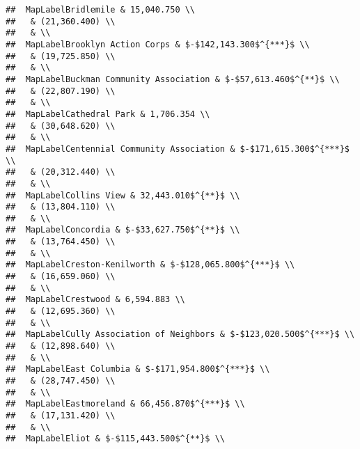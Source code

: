 \documentclass[]{article}
\begin{document}
\begin{verbatim}
##  MapLabelBridlemile & 15,040.750 \\ 
##   & (21,360.400) \\ 
##   & \\ 
##  MapLabelBrooklyn Action Corps & $-$142,143.300$^{***}$ \\ 
##   & (19,725.850) \\ 
##   & \\ 
##  MapLabelBuckman Community Association & $-$57,613.460$^{**}$ \\ 
##   & (22,807.190) \\ 
##   & \\ 
##  MapLabelCathedral Park & 1,706.354 \\ 
##   & (30,648.620) \\ 
##   & \\ 
##  MapLabelCentennial Community Association & $-$171,615.300$^{***}$ \\ 
##   & (20,312.440) \\ 
##   & \\ 
##  MapLabelCollins View & 32,443.010$^{**}$ \\ 
##   & (13,804.110) \\ 
##   & \\ 
##  MapLabelConcordia & $-$33,627.750$^{**}$ \\ 
##   & (13,764.450) \\ 
##   & \\ 
##  MapLabelCreston-Kenilworth & $-$128,065.800$^{***}$ \\ 
##   & (16,659.060) \\ 
##   & \\ 
##  MapLabelCrestwood & 6,594.883 \\ 
##   & (12,695.360) \\ 
##   & \\ 
##  MapLabelCully Association of Neighbors & $-$123,020.500$^{***}$ \\ 
##   & (12,898.640) \\ 
##   & \\ 
##  MapLabelEast Columbia & $-$171,954.800$^{***}$ \\ 
##   & (28,747.450) \\ 
##   & \\ 
##  MapLabelEastmoreland & 66,456.870$^{***}$ \\ 
##   & (17,131.420) \\ 
##   & \\ 
##  MapLabelEliot & $-$115,443.500$^{**}$ \\ 

\end{verbatim}
\end{document}
